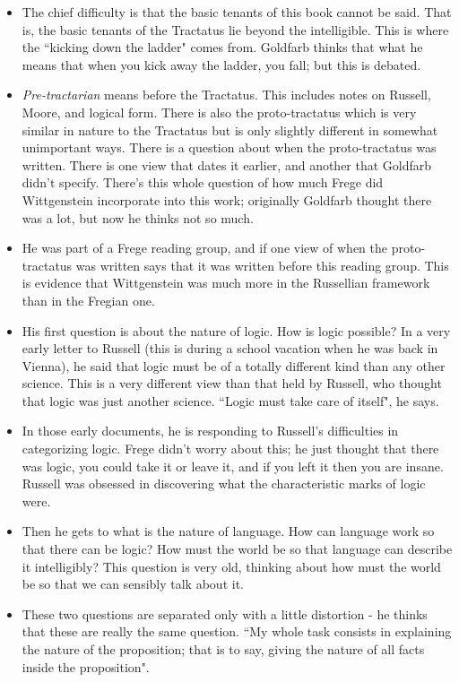 \documentclass[12pt]{article}
\theoremstyle{definition}
\begin{document}
\begin{itemize}
    \item The chief difficulty is that the basic tenants of this book cannot be said. That is, the basic tenants of the Tractatus lie beyond the intelligible.  This is where the ``kicking down the ladder" comes from. Goldfarb thinks that what he means that when you kick away the ladder, you fall; but this is debated.
    \item \textit{Pre-tractarian} means before the Tractatus. This includes notes on Russell, Moore, and logical form. There is also the proto-tractatus which is very similar in nature to the Tractatus but is only slightly different in somewhat unimportant ways. There is a question about when the proto-tractatus was written. There is one view that dates it earlier, and another that Goldfarb didn't specify. There's this whole question of how much Frege did Wittgenstein incorporate into this work; originally Goldfarb thought there was a lot, but now he thinks not so much.
    \item He was part of a Frege reading group, and if one view of when the proto-tractatus was written says that it was written before this reading group. This is evidence that Wittgenstein was much more in the Russellian framework than in the Fregian one.
    \item His first question is about the nature of logic. How is logic possible? In a very early letter to Russell (this is during a school vacation when he was back in Vienna), he said that logic must be of a totally different kind than any other science. This is a very different view than that held by Russell, who thought that logic was just another science. ``Logic must take care of itself", he says.
    \item In those early documents, he is responding to Russell's difficulties in categorizing logic. Frege didn't worry about this; he just thought that there was logic, you could take it or leave it, and if you left it then you are insane. Russell was obsessed in discovering what the characteristic marks of logic were. 
    \item Then he gets to what is the nature of language. How can language work so that there can be logic? How must the world be so that language can describe it intelligibly? This question is very old, thinking about how must the world be so that we can sensibly talk about it.
    \item These two questions are separated only with a little distortion - he thinks that these are really the same question. ``My whole task consists in explaining the nature of the proposition; that is to say, giving the nature of all facts inside the proposition".

\end{itemize}
\end{document}
